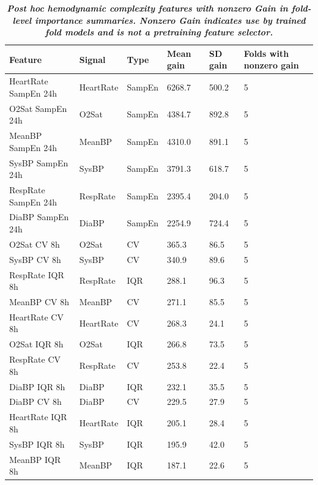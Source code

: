 \begin{table}[!t]
\centering
\caption{\textbf{\textit{Post hoc hemodynamic complexity features with nonzero Gain in fold-level importance summaries. Nonzero Gain indicates use by trained fold models and is not a pretraining feature selector.}}}
\label{tab:phase8_hemodynamic_features}
\scriptsize
\renewcommand{\arraystretch}{1.08}
\begin{tabular*}{\textwidth}{@{\extracolsep{\fill}}llllll}
\toprule
\textbf{Feature} & \textbf{Signal} & \textbf{Type} & \textbf{Mean gain} & \textbf{SD gain} & \textbf{Folds with nonzero gain} \\
\midrule
HeartRate SampEn 24h & HeartRate & SampEn & 6268.7 & 500.2 & 5 \\
O2Sat SampEn 24h & O2Sat & SampEn & 4384.7 & 892.8 & 5 \\
MeanBP SampEn 24h & MeanBP & SampEn & 4310.0 & 891.1 & 5 \\
SysBP SampEn 24h & SysBP & SampEn & 3791.3 & 618.7 & 5 \\
RespRate SampEn 24h & RespRate & SampEn & 2395.4 & 204.0 & 5 \\
DiaBP SampEn 24h & DiaBP & SampEn & 2254.9 & 724.4 & 5 \\
O2Sat CV 8h & O2Sat & CV & 365.3 & 86.5 & 5 \\
SysBP CV 8h & SysBP & CV & 340.9 & 89.6 & 5 \\
RespRate IQR 8h & RespRate & IQR & 288.1 & 96.3 & 5 \\
MeanBP CV 8h & MeanBP & CV & 271.1 & 85.5 & 5 \\
HeartRate CV 8h & HeartRate & CV & 268.3 & 24.1 & 5 \\
O2Sat IQR 8h & O2Sat & IQR & 266.8 & 73.5 & 5 \\
RespRate CV 8h & RespRate & CV & 253.8 & 22.4 & 5 \\
DiaBP IQR 8h & DiaBP & IQR & 232.1 & 35.5 & 5 \\
DiaBP CV 8h & DiaBP & CV & 229.5 & 27.9 & 5 \\
HeartRate IQR 8h & HeartRate & IQR & 205.1 & 28.4 & 5 \\
SysBP IQR 8h & SysBP & IQR & 195.9 & 42.0 & 5 \\
MeanBP IQR 8h & MeanBP & IQR & 187.1 & 22.6 & 5 \\
\bottomrule
\end{tabular*}
\end{table}
